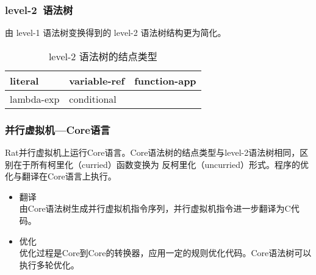 \documentclass{beamer}
\begin{document}
\begin{frame}
  \frametitle{level-2~语法树}
  由 level-1 语法树变换得到的 level-2 语法树结构更为简化。
  \begin{table}
    \caption{level-2 语法树的结点类型}
    \begin{tabular}{|l|l|l|}
      \hline
      literal & variable-ref & function-app\\
      \hline
      lambda-exp & conditional &\\
      \hline
    \end{tabular}
  \end{table}
\end{frame}

\begin{frame}
  \frametitle{并行虚拟机---Core语言}
  Rat并行虚拟机上运行Core语言。Core语法树的结点类型与level-2语法树相同，区别在于所有柯里化（curried）函数变换为
  反柯里化（uncurried）形式。程序的优化与翻译在Core语言上执行。
  \begin{itemize}
    \item 翻译\\
      由Core语法树生成并行虚拟机指令序列，并行虚拟机指令进一步翻译为C代码。
    \item 优化\\
      优化过程是Core到Core的转换器，应用一定的规则优化代码。Core语法树可以执行多轮优化。
  \end{itemize}
\end{frame}

\end{document}
